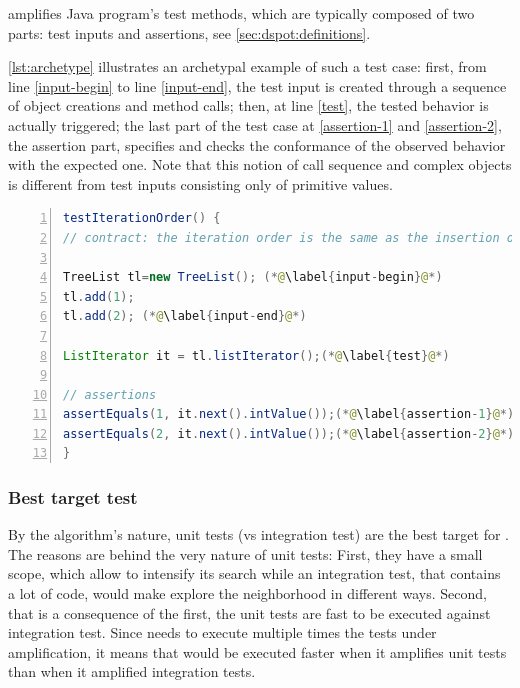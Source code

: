 \dspot amplifies Java program's test methods, which are typically composed of two parts: test inputs and assertions, see \autoref{sec:dspot:definitions}.

\autoref{lst:archetype} illustrates an archetypal example of such a test case: 
first, from line \autoref{input-begin} to line \autoref{input-end}, the test input is created through a sequence of object creations and method calls; 
then, at line \autoref{test}, the tested behavior is actually triggered; 
the last part of the test case at \autoref{assertion-1} and \autoref{assertion-2}, the assertion part, specifies and checks the conformance of the observed behavior with the expected one.
Note that this notion of call sequence and complex objects is different from test inputs consisting only of primitive values.

\begin{lstlisting}[caption={An example of an object-oriented test case  (inspired from Apache Commons Collections)},label=lst:archetype,float,language=java,numbers=left] 
testIterationOrder() {
// contract: the iteration order is the same as the insertion order

TreeList tl=new TreeList(); (*@\label{input-begin}@*)
tl.add(1);
tl.add(2); (*@\label{input-end}@*)

ListIterator it = tl.listIterator();(*@\label{test}@*)

// assertions
assertEquals(1, it.next().intValue());(*@\label{assertion-1}@*)
assertEquals(2, it.next().intValue());(*@\label{assertion-2}@*)
}
\end{lstlisting}

\subsubsection{Best target test}
\label{subsubsec:dspot:overview:appliance-to-unit-test:target-test}

By the algorithm's nature, unit tests (vs integration test) are the best target for \dspot.
The reasons are behind the very nature of unit tests:
First, they have a small scope, which allow \dspot to intensify its search while an integration test, that contains a lot of code, would make \dspot explore the neighborhood in different ways.
Second, that is a consequence of the first, the unit tests are fast to be executed against integration test.
Since \dspot needs to execute multiple times the tests under amplification, it means that \dspot would be executed faster when it amplifies unit tests than when it amplified integration tests.

